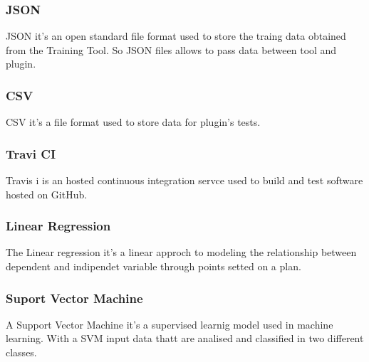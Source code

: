 \subsubsection{JSON}
JSON it's an open standard file format used to store the traing data obtained from the Training Tool. So JSON files allows to pass data between tool and plugin.

\subsubsection{CSV}
CSV it's a file format used to store data for plugin's tests.

\subsubsection{Travi CI}
Travis i is an hosted continuous integration servce used to build and test software hosted on GitHub.

\subsubsection{Linear Regression}
The Linear regression it's a linear approch to modeling the relationship between dependent and indipendet variable through points setted on a plan.

\subsubsection{Suport Vector Machine}
A Support Vector Machine it's a supervised learnig model used in machine learning. With a SVM input data thatt are analised  and classified in two different classes.
 